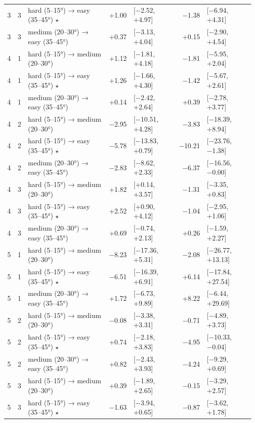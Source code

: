 \begin{table}[htbp]
\begin{tabular}{rllrlrl}
    3 & 3 & hard (5–15°) → easy (35–45°) $\star$ & +1.00 & [−2.52, +4.97] & −1.38 & [−6.94, +4.31] \\
    3 & 3 & medium (20–30°) → easy (35–45°) & +0.37 & [−3.13, +4.04] & +0.15 & [−2.90, +4.54] \\
    4 & 1 & hard (5–15°) → medium (20–30°) & +1.12 & [−1.81, +4.18] & −1.81 & [−5.95, +2.04] \\
    4 & 1 & hard (5–15°) → easy (35–45°) $\star$ & +1.26 & [−1.66, +4.30] & −1.42 & [−5.67, +2.61] \\
    4 & 1 & medium (20–30°) → easy (35–45°) & +0.14 & [−2.42, +2.64] & +0.39 & [−2.78, +3.77] \\
    4 & 2 & hard (5–15°) → medium (20–30°) & −2.95 & [−10.51, +4.28] & −3.83 & [−18.39, +8.94] \\
    4 & 2 & hard (5–15°) → easy (35–45°) $\star$ & −5.78 & [−13.83, +0.79] & −10.21 & [−23.76, −1.38] \\
    4 & 2 & medium (20–30°) → easy (35–45°) & −2.83 & [−8.62, +2.33] & −6.37 & [−16.56, −0.00] \\
    4 & 3 & hard (5–15°) → medium (20–30°) & +1.82 & [+0.14, +3.57] & −1.31 & [−3.35, +0.83] \\
    4 & 3 & hard (5–15°) → easy (35–45°) $\star$ & +2.52 & [+0.90, +4.12] & −1.04 & [−2.95, +1.06] \\
    4 & 3 & medium (20–30°) → easy (35–45°) & +0.69 & [−0.74, +2.13] & +0.26 & [−1.59, +2.27] \\
    5 & 1 & hard (5–15°) → medium (20–30°) & −8.23 & [−17.36, +5.31] & −2.08 & [−26.77, +13.13] \\
    5 & 1 & hard (5–15°) → easy (35–45°) $\star$ & −6.51 & [−16.39, +6.91] & +6.14 & [−17.84, +27.54] \\
    5 & 1 & medium (20–30°) → easy (35–45°) & +1.72 & [−6.73, +9.89] & +8.22 & [−6.44, +29.69] \\
    5 & 2 & hard (5–15°) → medium (20–30°) & −0.08 & [−3.38, +3.31] & −0.71 & [−4.89, +3.73] \\
    5 & 2 & hard (5–15°) → easy (35–45°) $\star$ & +0.74 & [−2.18, +3.83] & −4.95 & [−10.33, −0.04] \\
    5 & 2 & medium (20–30°) → easy (35–45°) & +0.82 & [−2.43, +3.93] & −4.24 & [−9.29, +0.69] \\
    5 & 3 & hard (5–15°) → medium (20–30°) & +0.39 & [−1.89, +2.65] & −0.15 & [−3.29, +2.57] \\
    5 & 3 & hard (5–15°) → easy (35–45°) $\star$ & −1.63 & [−3.94, +0.65] & −0.87 & [−3.62, +1.78] \\

\end{tabular}
\end{table}

